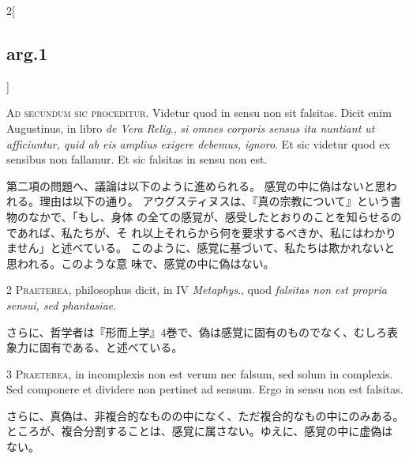 \documentclass[paper=a4paper,fontsize=10pt,jafontsize=9pt,titlepage]{jlreq}
\begin{document}
\begin{paracol}{2}[\subsection{arg.1}]


{\huge A}{\scshape d secundum sic proceditur}. Videtur quod in sensu
non sit falsitas. Dicit enim Augustinus, in libro {\itshape de Vera Relig}., {\itshape si
omnes corporis sensus ita nuntiant ut afficiuntur, quid ab eis amplius
exigere debemus, ignoro}. Et sic videtur quod ex sensibus non
fallamur. Et sic falsitas in sensu non est.

\switchcolumn

第二項の問題へ、議論は以下のように進められる。
感覚の中に偽はないと思われる。理由は以下の通り。
アウグスティヌスは、『真の宗教について』という書物のなかで、「もし、身体
 の全ての感覚が、感受したとおりのことを知らせるのであれば、私たちが、そ
 れ以上それらから何を要求するべきか、私にはわかりません」と述べている。
 このように、感覚に基づいて、私たちは欺かれないと思われる。このような意
 味で、感覚の中に偽はない。



{\scshape 2 Praeterea}, philosophus dicit, in IV {\itshape Metaphys}., quod
{\itshape falsitas non est propria sensui, sed phantasiae}.

\switchcolumn

さらに、哲学者は『形而上学』4巻で、偽は感覚に固有のものでなく、むしろ表
 象力に固有である、と述べている。



{\scshape 3 Praeterea}, in incomplexis non est verum nec falsum, sed
solum in complexis. Sed componere et dividere non pertinet ad
sensum. Ergo in sensu non est falsitas.

\switchcolumn

さらに、真偽は、非複合的なものの中になく、ただ複合的なもの中にのみある。
 ところが、複合分割することは、感覚に属さない。ゆえに、感覚の中に虚偽は
 ない。

\switchcolumn*[\subsection{s.c.}]



\end{paracol}
\end{document}
